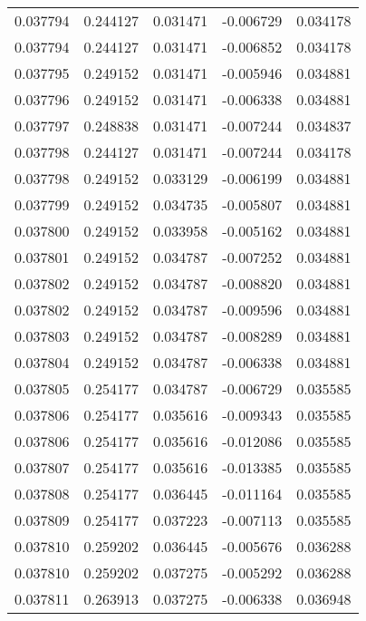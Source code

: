 \begin{tabular}{lrrrr}
0.037794    &  0.244127 &  0.031471 & -0.006729 &             0.034178 \\
0.037794    &  0.244127 &  0.031471 & -0.006852 &             0.034178 \\
0.037795    &  0.249152 &  0.031471 & -0.005946 &             0.034881 \\
0.037796    &  0.249152 &  0.031471 & -0.006338 &             0.034881 \\
0.037797    &  0.248838 &  0.031471 & -0.007244 &             0.034837 \\
0.037798    &  0.244127 &  0.031471 & -0.007244 &             0.034178 \\
0.037798    &  0.249152 &  0.033129 & -0.006199 &             0.034881 \\
0.037799    &  0.249152 &  0.034735 & -0.005807 &             0.034881 \\
0.037800    &  0.249152 &  0.033958 & -0.005162 &             0.034881 \\
0.037801    &  0.249152 &  0.034787 & -0.007252 &             0.034881 \\
0.037802    &  0.249152 &  0.034787 & -0.008820 &             0.034881 \\
0.037802    &  0.249152 &  0.034787 & -0.009596 &             0.034881 \\
0.037803    &  0.249152 &  0.034787 & -0.008289 &             0.034881 \\
0.037804    &  0.249152 &  0.034787 & -0.006338 &             0.034881 \\
0.037805    &  0.254177 &  0.034787 & -0.006729 &             0.035585 \\
0.037806    &  0.254177 &  0.035616 & -0.009343 &             0.035585 \\
0.037806    &  0.254177 &  0.035616 & -0.012086 &             0.035585 \\
0.037807    &  0.254177 &  0.035616 & -0.013385 &             0.035585 \\
0.037808    &  0.254177 &  0.036445 & -0.011164 &             0.035585 \\
0.037809    &  0.254177 &  0.037223 & -0.007113 &             0.035585 \\
0.037810    &  0.259202 &  0.036445 & -0.005676 &             0.036288 \\
0.037810    &  0.259202 &  0.037275 & -0.005292 &             0.036288 \\
0.037811    &  0.263913 &  0.037275 & -0.006338 &             0.036948 \\

\end{tabular}
